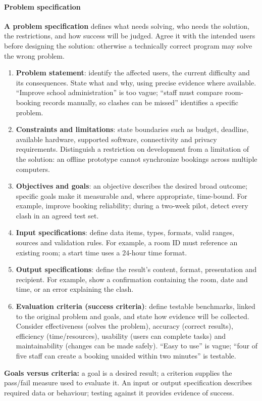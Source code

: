 \documentclass[a4paper,12pt]{article}
\begin{document}
\paragraph{Problem specification}
\textbf{A problem specification} defines what needs solving, who needs the solution, the restrictions, and how success will be judged. Agree it with the intended users before designing the solution: otherwise a technically correct program may solve the wrong problem.
\begin{enumerate}
    \item \textbf{Problem statement}: identify the affected users, the current difficulty and its consequences. State what and why, using precise evidence where available. ``Improve school administration'' is too vague; ``staff must compare room-booking records manually, so clashes can be missed'' identifies a specific problem.
    \item \textbf{Constraints and limitations}: state boundaries such as budget, deadline, available hardware, supported software, connectivity and privacy requirements. Distinguish a restriction on development from a limitation of the solution: an offline prototype cannot synchronize bookings across multiple computers.
    \item \textbf{Objectives and goals}: an objective describes the desired broad outcome; specific goals make it measurable and, where appropriate, time-bound. For example, improve booking reliability; during a two-week pilot, detect every clash in an agreed test set.
    \item \textbf{Input specifications}: define data items, types, formats, valid ranges, sources and validation rules. For example, a room ID must reference an existing room; a start time uses a 24-hour time format.
    \item \textbf{Output specifications}: define the result's content, format, presentation and recipient. For example, show a confirmation containing the room, date and time, or an error explaining the clash.
    \item \textbf{Evaluation criteria (success criteria)}: define testable benchmarks, linked to the original problem and goals, and state how evidence will be collected. Consider effectiveness (solves the problem), accuracy (correct results), efficiency (time/resources), usability (users can complete tasks) and maintainability (changes can be made safely). ``Easy to use'' is vague; ``four of five staff can create a booking unaided within two minutes'' is testable.
\end{enumerate}
\textbf{Goals versus criteria:} a goal is a desired result; a criterion supplies the pass/fail measure used to evaluate it. An input or output specification describes required data or behaviour; testing against it provides evidence of success.
\end{document}
